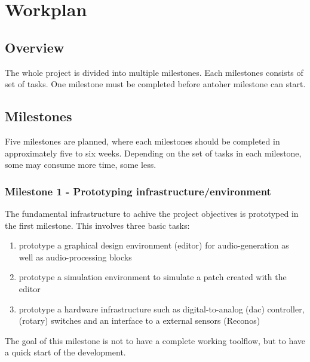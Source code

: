 
\chapter{Workplan}


\section{Overview}


The whole project is divided into multiple milestones. Each milestones consists of set of tasks. One milestone must be completed before antoher milestone can start.

\section{Milestones}

Five milestones are planned, where each milestones should be completed in approximately five to six weeks. Depending on the set of tasks in each milestone, some may consume more time, some less.

\subsection{Milestone 1 - Prototyping infrastructure/environment}
The fundamental infrastructure to achive the project objectives is prototyped in the first milestone. This involves three basic tasks:

\begin{enumerate}
	\item prototype a graphical design environment (editor) for audio-generation as well as audio-processing blocks
	\item prototype a simulation environment to simulate a patch created with the editor
	\item prototype a hardware infrastructure such as digital-to-analog (dac) controller, (rotary) switches and an interface to a external sensors (Reconos)
\end{enumerate}
The goal of this milestone is not to have a complete working toolflow, but to have a quick start of the development.

